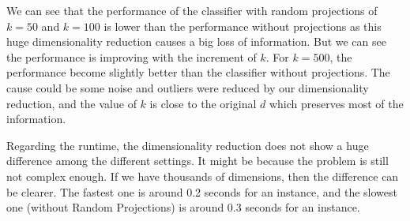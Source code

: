 We can see that the performance of the classifier with random projections of $k=50$ and $k=100$ is lower than the performance without projections as this huge dimensionality reduction causes a big loss of information. But we can see the performance is improving with the increment of $k$.
For $k=500$, the performance become slightly better than the classifier without projections. The cause could be some noise and outliers were reduced by our dimensionality reduction, and the value of $k$ is close to the original $d$ which preserves most of the information. 

Regarding the runtime, the dimensionality reduction does not show a huge difference among the different settings. It might be because the problem is still not complex enough. If we have thousands of dimensions, then the difference can be clearer. The fastest one is around 0.2 seconds for an instance, and the slowest one (without Random Projections) is around 0.3 seconds for an instance.
